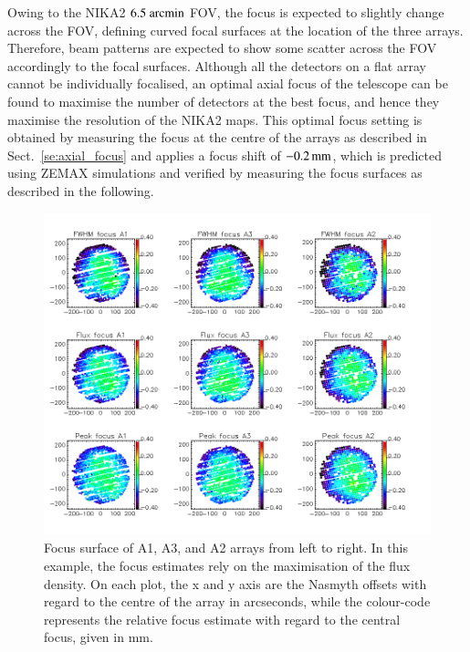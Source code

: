 \documentclass[traditionalabstract]{aa}
\begin{document}
{\begin{appendix}
Owing to the NIKA2 $6.5~\rm{arcmin}$ FOV, the focus is expected to
slightly change across the FOV, defining curved focal surfaces at the
location of the three arrays. Therefore, beam patterns are expected to
show some scatter across the FOV accordingly to the focal
surfaces. Although all the detectors on a flat array cannot be
individually focalised, an optimal axial focus of the telescope can be
found to maximise the number of detectors at the best focus, and hence they
maximise the resolution of the NIKA2 maps.
This optimal focus setting is obtained by measuring the focus at the
centre of the arrays as described in Sect.~\ref{se:axial_focus} and applies
a focus shift of $-0.2\,\rm{mm}$, which is 
predicted using ZEMAX simulations and verified by measuring
the focus surfaces as described in the following.

\begin{figure}[!thbp]
\begin{center}
  \includegraphics[trim={0, 9.5cm, 0, 9.5cm}, clip=true, width=\linewidth]{Figures/fov_focus_mv_5.png}
\caption[Focus surfaces]{Focus surface of A1, A3, and A2 arrays from left to
  right. In this example, the focus estimates rely on the maximisation of the flux
  density. On each plot, the x and y axis are the Nasmyth offsets
  with regard to the centre of the array in arcseconds, while the colour-code represents
  the relative focus estimate with regard to the central focus, given in mm.}
\label{fig:focus-surfaces}
\end{center}
\end{figure}


\end{appendix}}
\end{document}
